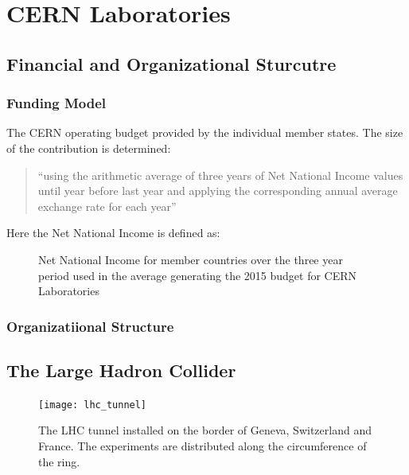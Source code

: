 \chapter{CERN Laboratories}

\section{Financial and Organizational Sturcutre }

\subsection{Funding Model}

The CERN operating budget provided by the individual member states. The size of the contribution is determined:
\begin{quote}
``using the arithmetic average of three years of Net National
Income values until year before last year and applying the corresponding annual average
exchange rate for each year''
\end{quote}
Here the Net National Income is defined as:


 


\begin{figure}
\begin{center}
\caption{Net National Income for member countries over the three year period used in the average 
generating the 2015 budget for CERN Laboratories}
\end{center}
\end{figure}

\subsection{Organizatiional Structure}



\section{The Large Hadron Collider}

\begin{figure}
\begin{center}
\texttt{[image: lhc\_tunnel]}
\caption{The LHC tunnel installed on the border of Geneva, Switzerland and France. 
The experiments are distributed along the circumference of the ring.}
\end{center}
\end{figure}

